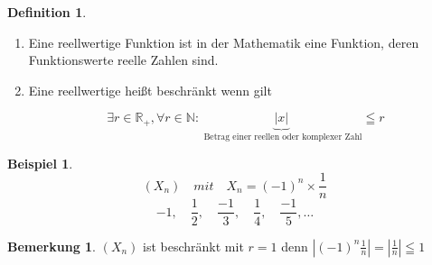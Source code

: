 \documentclass[a4paper,12pt,leqno]{report}
\theoremstyle{plain} %
\theoremstyle{definition} %
\newtheorem{remark}[theorem]{Bemerkung}
\newtheorem{definition}[theorem]{Definition}
\newtheorem{example}[theorem]{Beispiel}
\begin{document}
    \begin{definition}


        \begin{enumerate}

            \mbox{}\item Eine reellwertige Funktion ist in der Mathematik eine Funktion, deren Funktionswerte reelle Zahlen sind.

            \item Eine reellwertige heißt beschränkt wenn gilt

            \[	\exists r \in \mathbb{R}_+ , \forall r \in \mathbb{N}: \underbrace{|x|}_{\text{ Betrag einer reellen oder komplexer Zahl}} \leqq r   \]

        \end{enumerate}
    \end{definition}

    \begin{example}
        \[(X_n)\quad mit \quad X_n = (-1)^n \times \frac{1}{n} \]
        \[-1 ,\quad \frac{1}{2}, \quad \frac{-1}{3}, \quad \frac{1}{4} ,\quad \frac{-1}{5},\dots \]
    \end{example}

    \begin{remark}

        $(X_n)$ ist beschränkt mit $r = 1$ denn $|(-1)^n \frac{1}{n}|=|\frac{1}{n}| \leqq 1  $

    \end{remark}
\end{document}
